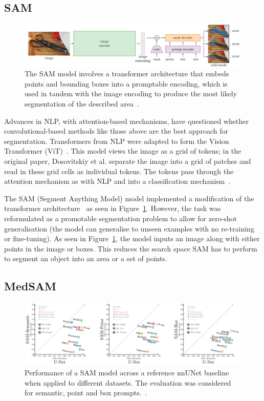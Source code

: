 \documentclass[11pt,twoside]{report}
\begin{document}

\subsection{SAM}\label{sect:sam}

\begin{figure}[H]
  \centering
  \includegraphics[width=1\linewidth]{../figures/SAM.png}
  \caption{The SAM model involves a transformer architecture that embeds points and bounding boxes into a promptable encoding, which is used in tandem with the image encoding to produce the most likely segmentation of the described area~\cite{SAM}.}\label{fig:sam}
\end{figure}

Advances in NLP, with attention-based mechanisms, have questioned whether convolutional-based methods like those above are the best approach for segmentation. Transformers from NLP were adapted to form the Vision Transformer (ViT)~\cite{ViT}. This model views the image as a grid of tokens; in the original paper, Dosovitskiy et al. separate the image into a grid of patches and read in these grid cells as individual tokens. The tokens pass through the attention mechanism as with NLP and into a classification mechanism~\cite{ViT}. 

The SAM (Segment Anything Model) model implemented a modification of the transformer architecture~\cite{SAM} as seen in Figure~\ref{fig:sam}. However, the task was reformulated as a promotable segmentation problem to allow for zero-shot generalisation (the model can generalise to unseen examples with no re-training or fine-tuning). As seen in Figure~\ref{fig:sam}, the model inputs an image along with either points in the image or boxes. This reduces the search space SAM has to perform to segment an object into an area or a set of points.

\subsection{MedSAM}\label{sect:medsam}

\begin{figure}[H]
  \centering
  \includegraphics[width=1\linewidth]{../figures/sam-performance.png}
  \caption{Performance of a SAM model across a reference nnUNet baseline when applied to different datasets. The evaluation was considered for semantic, point and box prompts.~\cite{he2023computervision}.}\label{fig:sam-performance}
\end{figure}
\end{document}
